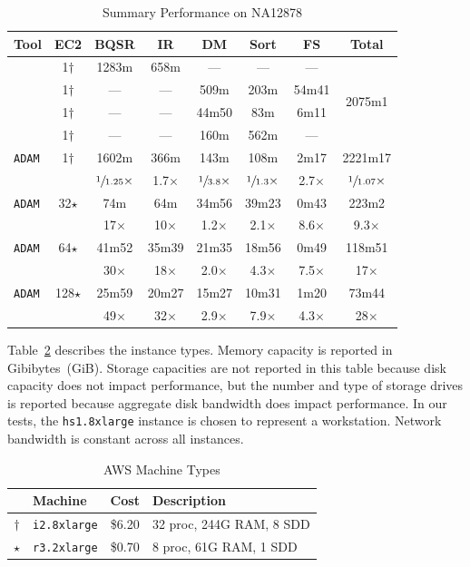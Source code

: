 \documentclass[masters]{ucbthesis}
\begin{document}
\begin{table}[h]
\centering
\caption{Summary Performance on NA12878}
\label{tab:overview}
\begin{tabular}{ l | c | c c c c c | c }
\hline
Tool & EC2 & BQSR & IR & DM & Sort & FS & Total \\
\hline
\hline
\cite{depristo11} & 1$\dagger$ & 1283m & 658m & --- & --- & --- & \multirow{4}{*}{2075m1} \\
\cite{li09} & 1$\dagger$ & --- & --- & 509m & 203m & 54m41 & \\
\cite{tarasov15} & 1$\dagger$ & --- & --- & 44m50 & 83m & 6m11 & \\
\cite{picard} & 1$\dagger$ & --- & --- & 160m & 562m & --- & \\
\hline
\texttt{ADAM} & 1$\dagger$ & 1602m & 366m & 143m & 108m & 2m17 & 2221m17 \\
 & & $\sfrac{1}{1.25}\times$ & 1.7$\times$ & $\sfrac{1}{3.8}\times$ & $\sfrac{1}{1.3}\times$ & 2.7$\times$ & $\sfrac{1}{1.07}\times$ \\
\hline
\texttt{ADAM} & 32$\star$ & 74m & 64m & 34m56 & 39m23 & 0m43 & 223m2 \\
 & & 17$\times$ & 10$\times$ & 1.2$\times$ & 2.1$\times$ & 8.6$\times$ & 9.3$\times$ \\
\hline
\texttt{ADAM} & 64$\star$ & 41m52 & 35m39 & 21m35 & 18m56 & 0m49 & 118m51 \\
 & & 30$\times$ & 18$\times$ & 2.0$\times$ & 4.3$\times$ & 7.5$\times$ & 17$\times$ \\
\hline
\texttt{ADAM} & 128$\star$ & 25m59 & 20m27 & 15m27 & 10m31 & 1m20 & 73m44 \\
 & & 49$\times$ & 32$\times$ & 2.9$\times$ & 7.9$\times$ & 4.3$\times$ & 28$\times$ \\
\end{tabular}
\end{table}

Table~\ref{tab:machines} describes the instance types. Memory capacity is reported in Gibibytes~(GiB).
Storage capacities are not reported in this table because disk
capacity does not impact performance, but the number and type of storage drives is reported because
aggregate disk bandwidth does impact performance. In our tests, the \texttt{hs1.8xlarge} instance is
chosen to represent a workstation. Network bandwidth is constant across all instances.

\begin{table}[h]
\caption{AWS Machine Types}
\label{tab:machines}
\begin{center}
\begin{tabular}{ c l c l }
\hline
 & Machine & Cost & Description \\
\hline
\hline
$\dagger$ & \texttt{i2.8xlarge} & \$6.20 & 32 proc, 244G RAM, 8 SDD \\
$\star$ & \texttt{r3.2xlarge} & \$0.70 & 8 proc, 61G RAM, 1 SDD \\
\hline
\end{tabular}
\end{center}
\end{table}
\end{document}
